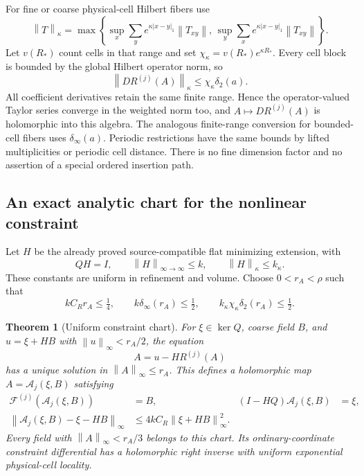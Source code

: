 \documentclass[11pt]{article}
\newtheorem{theorem}{Theorem}
\theoremstyle{remark}\newtheorem{remark}[theorem]{Remark}
\newcommand{\norm}[1]{\left\lVert#1\right\rVert}
\begin{document}
For fine or coarse physical-cell Hilbert fibers use
\begin{equation}
 \norm{T}_\kappa=\max\left\{
  \sup_x\sum_y e^{\kappa|x-y|_1}\norm{T_{xy}},\,
  \sup_y\sum_x e^{\kappa|x-y|_1}\norm{T_{xy}}\right\}.
 \label{na-schur-norm}
\end{equation}
Let $v(R_*)$ count cells in that range and set
$\chi_\kappa=v(R_*)e^{\kappa R_*}$. Every cell block is bounded
by the global Hilbert operator norm, so
\begin{equation}
 \norm{DR^{(j)}(A)}_\kappa\le\chi_\kappa\delta_2(a).
 \label{na-weighted-deviation}
\end{equation}
All coefficient derivatives retain the same finite range. Hence the
operator-valued Taylor series converge in the weighted norm too,
and $A\mapsto DR^{(j)}(A)$ is holomorphic into this algebra.
The analogous finite-range conversion for bounded-cell fibers uses
$\delta_\infty(a)$. Periodic restrictions have the same bounds by
lifted multiplicities or periodic cell distance. There is no fine
dimension factor and no assertion of a special ordered insertion
path.

\subsection{An exact analytic chart for the nonlinear constraint}
\label{na-chart}

Let $H$ be the already proved source-compatible flat minimizing
extension, with
\begin{equation}
 QH=I,\qquad \norm{H}_{\infty\to\infty}\le k,
 \qquad \norm{H}_\kappa\le k_\kappa.
 \label{na-H-input}
\end{equation}
These constants are uniform in refinement and volume. Choose
$0<r_A<\rho$ such that
\begin{equation}
 kC_Rr_A\le\tfrac14,\qquad
 k\delta_\infty(r_A)\le\tfrac12,\qquad
 k_\kappa\chi_\kappa\delta_2(r_A)\le\tfrac12.
 \label{na-chart-radius}
\end{equation}

\begin{theorem}[Uniform constraint chart]
\label{na-chart-theorem}
For $\xi\in\ker Q$, coarse field $B$, and
$u=\xi+HB$ with $\norm{u}_\infty<r_A/2$, the equation
\begin{equation}
 A=u-HR^{(j)}(A)
 \label{na-fixed-point}
\end{equation}
has a unique solution in $\norm{A}_\infty\le r_A$. This defines
a holomorphic map $A=\mathcal A_j(\xi,B)$ satisfying
\begin{align}
 \mathcal F^{(j)}(\mathcal A_j(\xi,B))&=B,
 & (I-HQ)\mathcal A_j(\xi,B)&=\xi,
 \label{na-chart-identities}\\
 \norm{\mathcal A_j(\xi,B)-\xi-HB}_\infty
   &\le4kC_R\norm{\xi+HB}_\infty^2.
 \label{na-chart-remainder}
\end{align}
Every field with $\norm{A}_\infty<r_A/3$ belongs to this chart.
Its ordinary-coordinate constraint differential has a holomorphic
right inverse with uniform exponential physical-cell locality.
\end{theorem}
\end{document}
